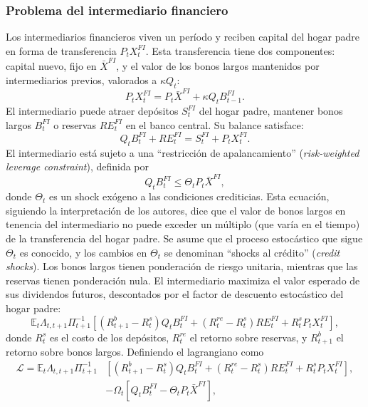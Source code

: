 \documentclass[../../entrega.tex]{subfiles}
\begin{document}
\subsubsection{Problema del intermediario financiero}
Los intermediarios financieros viven un período y reciben capital del hogar padre en forma de transferencia $P_t X_t^{FI}$.
Esta transferencia tiene dos componentes: capital nuevo, fijo en $\bar{X}^{FI}$, y el valor de los bonos largos mantenidos por intermediarios previos, valorados a $\kappa Q_t$:
\begin{equation*}
    P_t X_t^{FI} = P_t \bar{X}^{FI} + \kappa Q_t B_{t-1}^{FI}.
\end{equation*}
El intermediario puede atraer depósitos $S_t^{FI}$ del hogar padre, mantener bonos largos $B_t^{FI}$ o reservas $RE_t^{FI}$ en el banco central.
Su balance satisface:
\begin{equation}
    Q_t B_t^{FI} + RE_t^{FI} = S_t^{FI} + P_t X_t^{FI}.\label{eq:eq16}
\end{equation}
El intermediario está sujeto a una ``restricción de apalancamiento'' (\emph{risk-weighted leverage constraint}), definida por
\begin{equation}
    Q_t B_t^{FI} \leq \Theta_t P_t \bar{X}^{FI},\label{eq:eq18}
\end{equation}
donde $\Theta_t$ es un shock exógeno a las condiciones crediticias.
Esta ecuación, siguiendo la interpretación de los autores, dice que el valor de bonos largos en tenencia del intermediario no puede exceder un múltiplo (que varía en el tiempo) de la transferencia del hogar padre.
Se asume que el proceso estocástico que sigue $\Theta_t$ es conocido, y los cambios en $\Theta_t$ se denominan ``shocks al crédito'' (\emph{credit shocks}).
Los bonos largos tienen ponderación de riesgo unitaria, mientras que las reservas tienen ponderación nula.
El intermediario maximiza el valor esperado de sus dividendos futuros, descontados por el factor de descuento estocástico del hogar padre:
\begin{equation*}
    \mathbb{E}_t \Lambda_{t,t+1} \Pi_{t+1}^{-1}\left[(R_{t+1}^b - R_t^s)Q_t B_t^{FI} + (R_t^{re} - R_t^s)RE_t^{FI} + R_t^s P_t X_t^{FI}\right],
\end{equation*}
donde $R_t^s$ es el costo de los depósitos, $R_t^{re}$ el retorno sobre reservas, y $R_{t+1}^b$ el retorno sobre bonos largos.
Definiendo el lagrangiano como
\begin{equation*}
    \begin{aligned}
        \mathcal{L} = \mathbb{E}_t \Lambda_{t,t+1} \Pi_{t+1}^{-1} & \left[(R_{t+1}^b - R_t^s)Q_t B_t^{FI} + (R_t^{re} - R_t^s)RE_t^{FI} + R_t^s P_t X_t^{FI}\right], \\
                                                                  & - \Omega_t[Q_t B_t^{FI} - \Theta_t P_t \bar{X}^{FI}],
    \end{aligned}
\end{equation*}
\end{document}
